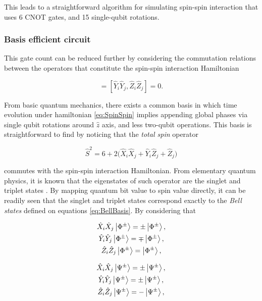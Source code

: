       This leads to a straightforward algorithm for simulating spin-spin interaction that uses 6 CNOT gates, and 15 single-qubit rotations. 
    
    \subsubsection{Basis efficient circuit}
    \label{subsubsec:BasisEfficientCircuit}

      This gate count can be reduced further by considering the commutation relations between the operators that constitute the spin-spin interaction Hamiltonian

      \begin{equation}
        [\hat{X}_i\hat{X}_j, \hat{Z}_i\hat{Z}_j] = [\hat{Y}_i\hat{Y}_j, \hat{Z}_i\hat{Z}_j] = 0.
        \label{eq:CommutationRelations}
      \end{equation}

      From basic quantum mechanics, there exists a common basis in which time evolution under hamiltonian \ref{eq:SpinSpin} implies appending global phases via single qubit rotations around $\hat{z}$ axis, and less two-qubit operations. This basis is straightforward to find by noticing that the \textit{total spin} operator

      \begin{equation}
        \hat{S}^2 = 6 + 2\Big(\hat{X}_i\hat{X}_j + \hat{Y}_i\hat{Z}_j + \hat{Z}_j\Big) 
        \label{eq:TotalSpin}
      \end{equation}

      \noindent commutes with the spin-spin interaction Hamiltonian. From elementary quantum physics, it is known that the eigenstates of such operator are the singlet and triplet states \cite{Beck}. By mapping quantum bit value to spin value directly, it can be readily seen that the singlet and triplet states correspond exactly to the \textit{Bell states} defined on equations \ref{eq:BellBasis}. By considering that

      \begin{gather}
        \hat{X}_i\hat{X}_j \ket{\Phi^{\pm}} = \pm\ket{\Phi^{\pm}}, \\
        \hat{Y}_i\hat{Y}_j \ket{\Phi^{\pm}} = \mp\ket{\Phi^{\pm}}, \\
        \hat{Z}_i\hat{Z}_j \ket{\Phi^{\pm}} = \ket{\Phi^{\pm}},
        \label{eq:PhiBellBasisOps}
      \end{gather}

      \begin{gather}
        \hat{X}_i\hat{X}_j \ket{\Psi^{\pm}} = \pm\ket{\Psi^{\pm}}, \\
        \hat{Y}_i\hat{Y}_j \ket{\Psi^{\pm}} = \pm\ket{\Psi^{\pm}}, \\
        \hat{Z}_i\hat{Z}_j \ket{\Psi^{\pm}} = -\ket{\Psi^{\pm}},
        \label{eq:PsiBellBasisOps}
      \end{gather}

